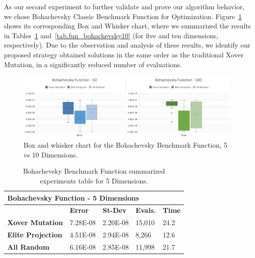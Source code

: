 \documentclass[graybox]{svmult}
\begin{document}
            As our second experiment to further validate and prove our
            algorithm behavior, we chose Bohachevsky Classic Benchmark Function
            for Optimization. Figure~\ref{fig.fun_bohachevsky} shows its
            corresponding Box and Whisker chart, where we summarized the
            results in Tables~\ref{tab.fun_bohachevsky5} and~\ref{tab.fun_bohachevsky10} 
            (for five and ten dimensions, respectively). Due to the observation 
            and analysis of these results, we identify our proposed strategy 
            obtained solutions in the same order as the traditional Xover Mutation, 
            in a significantly reduced number of evaluations.

            \begin{figure}
                \includegraphics[width=0.99\linewidth, frame]{img/fig_fun_bohachevsky.pdf}
                \caption{Box and whisker chart for the Bohachevsky Benchmark Function, 5 vs 10 Dimensions.} \label{fig.fun_bohachevsky}
                \end{figure}

            \begin{table}[]
                \scriptsize
                \centering
                \caption{Bohachevsky Benchmark Function summarized experiments table for 5 Dimensions.}\label{tab.fun_bohachevsky5}
                \begin{tabular}{@{}lllll@{}}
                \toprule
                \multicolumn{5}{l}{\textbf{Bohachevsky Function - 5 Dimensions}} \\ \midrule
                & \textbf{Error} & \textbf{St-Dev} & \textbf{Evals.} & \textbf{Time} \\
                \textbf{Xover Mutation} & 7.28E-08 & 2.20E-08 & 15,010 & 24.2 \\
                \textbf{Elite Projection} & 4.51E-08 & 2.94E-08 & 8,266 & 12.6 \\
                \textbf{All Random} & 6.16E-08 & 2.85E-08 & 11,998 & 21.7 \\ \bottomrule
                \end{tabular}
                \end{table}
\end{document}
